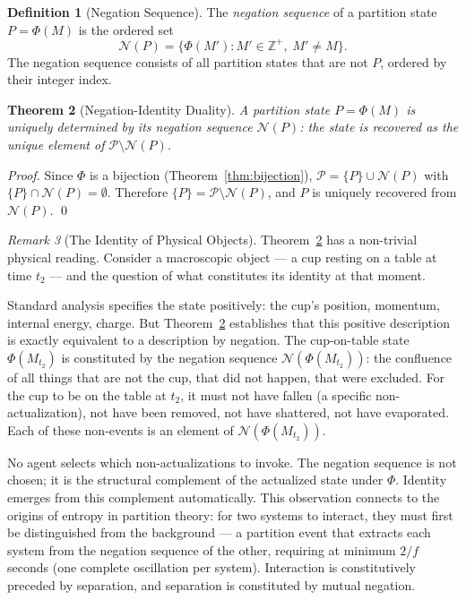 \documentclass[twocolumn,10pt,a4paper]{article}
\theoremstyle{thmstyle}
\newtheorem{theorem}{Theorem}[section]
\theoremstyle{definition}
\newtheorem{definition}[theorem]{Definition}
\theoremstyle{remark}
\newtheorem{remark}[theorem]{Remark}
\newcommand{\Zp}{\mathbb{Z}^{+}}
\newcommand{\Parts}{\mathcal{P}}
\newcommand{\PhiMap}{\varPhi}
\begin{document}
\begin{definition}[Negation Sequence]
\label{def:negation}
The \emph{negation sequence} of a partition state $P = \PhiMap(M)$ is the ordered set
\begin{equation}
    \mathcal{N}(P) = \bigl\{ \PhiMap(M') : M' \in \Zp,\; M' \neq M \bigr\}.
\end{equation}
The negation sequence consists of all partition states that are not $P$, ordered by their integer index.
\end{definition}

\begin{theorem}[Negation-Identity Duality]
\label{thm:negation-duality}
A partition state $P = \PhiMap(M)$ is uniquely determined by its negation sequence $\mathcal{N}(P)$: the state is recovered as the unique element of $\Parts \setminus \mathcal{N}(P)$.
\end{theorem}

\begin{proof}
Since $\PhiMap$ is a bijection (Theorem~\ref{thm:bijection}), $\Parts = \{P\} \cup \mathcal{N}(P)$ with $\{P\} \cap \mathcal{N}(P) = \emptyset$. Therefore $\{P\} = \Parts \setminus \mathcal{N}(P)$, and $P$ is uniquely recovered from $\mathcal{N}(P)$. \qed
\end{proof}

\begin{remark}[The Identity of Physical Objects]
\label{rem:cup}
Theorem~\ref{thm:negation-duality} has a non-trivial physical reading. Consider a macroscopic object --- a cup resting on a table at time $t_2$ --- and the question of what constitutes its identity at that moment.

Standard analysis specifies the state positively: the cup's position, momentum, internal energy, charge. But Theorem~\ref{thm:negation-duality} establishes that this positive description is exactly equivalent to a description by negation. The cup-on-table state $\PhiMap(M_{t_2})$ is constituted by the negation sequence $\mathcal{N}(\PhiMap(M_{t_2}))$: the confluence of all things that are not the cup, that did not happen, that were excluded. For the cup to be on the table at $t_2$, it must not have fallen (a specific non-actualization), not have been removed, not have shattered, not have evaporated. Each of these non-events is an element of $\mathcal{N}(\PhiMap(M_{t_2}))$.

No agent selects which non-actualizations to invoke. The negation sequence is not chosen; it is the structural complement of the actualized state under $\PhiMap$. Identity emerges from this complement automatically. This observation connects to the origins of entropy in partition theory: for two systems to interact, they must first be distinguished from the background --- a partition event that extracts each system from the negation sequence of the other, requiring at minimum $2/f$ seconds (one complete oscillation per system). Interaction is constitutively preceded by separation, and separation is constituted by mutual negation.
\end{remark}
\end{document}
